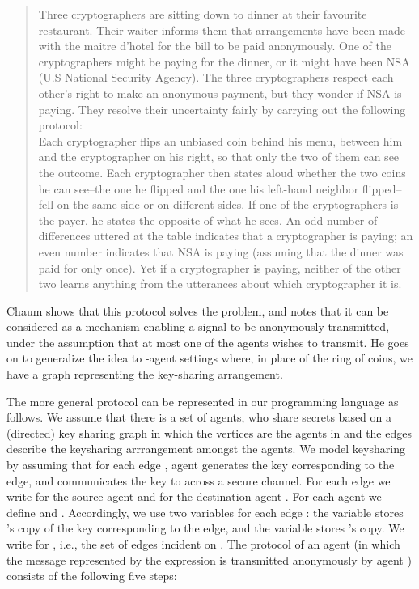 \documentclass[]{llncs}
\begin{document}
\begin{quote}
Three cryptographers are sitting down to dinner at their favourite restaurant.
Their waiter informs them that arrangements have been made with the maitre d'hotel
for the bill to be paid anonymously. One of the cryptographers might be paying for
the dinner, or it might have been NSA (U.S National Security Agency). The three
cryptographers respect each other's right to make an anonymous payment, but they
wonder if NSA is paying. They resolve their uncertainty fairly by carrying out the following protocol:\\
Each cryptographer flips an unbiased coin behind his menu, between him and the cryptographer on his right, so that only the two of them can see the outcome. Each cryptographer then states aloud whether the two coins he can see--the one he flipped and the one his left-hand neighbor flipped--fell on the same side or on different sides. If one of the cryptographers is the payer, he states the opposite of what he sees. An odd number of differences uttered at the table indicates that a cryptographer is paying; an even number indicates that NSA is paying (assuming that the dinner was paid for only once). Yet if a cryptographer is paying, neither of the other two learns anything from the utterances about which cryptographer it is.
\end{quote}

\newcommand{\inedges}{{\it in}} 
\newcommand{\outedges}{{\it out}} 

Chaum shows that this protocol solves the problem, and notes that it can be considered
as a mechanism enabling a signal to be anonymously transmitted, under the  
assumption that at most one of the agents wishes to transmit. 
He goes on to generalize the idea to -agent settings where, in 
place of the ring of coins, we have a graph 
representing the key-sharing arrangement. 

The more general protocol can be represented in our
programming language as follows. We assume that there is a set 
 of agents, who share secrets based on a (directed) key sharing graph 
 in which the vertices are the agents in  and the edges  
describe the keysharing arrrangement amongst the agents. 
We model keysharing by assuming that for each edge , 
agent  generates the key corresponding to the edge, and 
communicates the key to  across a secure channel. 
For each edge  we write  for the source agent  and  for the destination agent . 
For each agent  we define  and 
.  Accordingly, we use two variables for each edge : the variable 
 stores 's copy of the key corresponding to the edge,  and the variable 
 stores  's copy. We write  for , i.e., the set of edges incident on . 
The protocol  of an agent  (in which the message represented by the expression  
is transmitted anonymously by agent ) consists of  the following five steps: 
\end{document}
